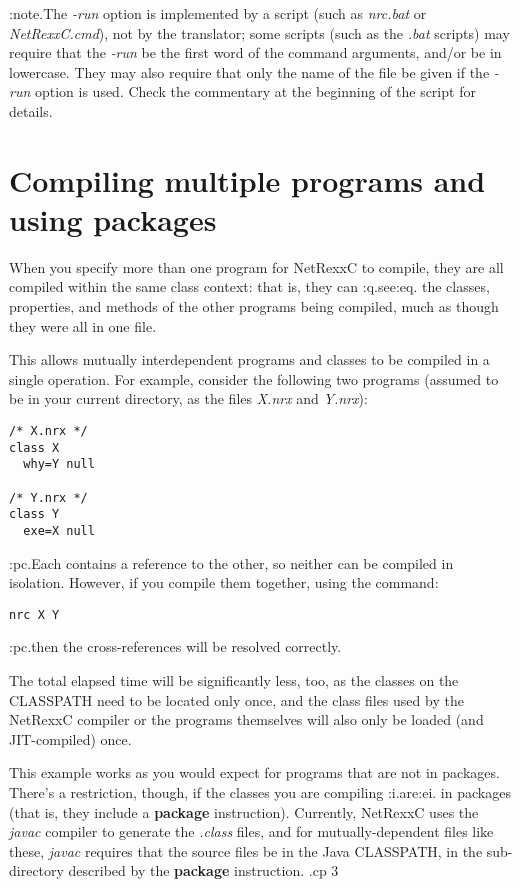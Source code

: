 :note.The \emph{-run} option is implemented by a script (such
as \emph{nrc.bat} or \emph{NetRexxC.cmd}), not by the translator; some
scripts (such as the \emph{.bat} scripts) may require that
the \emph{-run} be the first word of the command arguments, and/or be in
lowercase.  They may also require that only the name of the file be
given if the \emph{-run} option is used.  Check the commentary at the
beginning of the script for details.

\section{Compiling multiple programs and using packages}

When you specify more than one program for NetRexxC to compile, they are
all compiled within the same class context: that is, they can :q.see:eq.
the classes, properties, and methods of the other programs being
compiled, much as though they were all in one file.

This allows mutually interdependent programs and classes to be compiled
in a single operation.  For example, consider the following two programs
(assumed to be in your current directory, as the files \emph{X.nrx}
and \emph{Y.nrx}):
\begin{verbatim}
/* X.nrx */
class X
  why=Y null

/* Y.nrx */
class Y
  exe=X null
\end{verbatim}
:pc.Each contains a reference to the other, so neither can be compiled in
isolation.  However, if you compile them together, using the command:
\begin{verbatim}
nrc X Y
\end{verbatim}
:pc.then the cross-references will be resolved correctly.

The total elapsed time will be significantly less, too, as the classes
on the CLASSPATH need to be located only once, and the class files used
by the NetRexxC compiler or the programs themselves will also only be
loaded (and JIT-compiled) once.

This example works as you would expect for programs that are not in
packages.  There's a restriction, though, if the classes you are
compiling :i.are:ei. in packages (that is, they include a
\textbf{package} instruction).  Currently, NetRexxC uses the \emph{javac}
compiler to generate the \emph{.class} files, and for mutually-dependent
files like these, \emph{javac} requires that the source files be in the
Java CLASSPATH, in the sub-directory described by the \textbf{package}
instruction.
.cp 3


